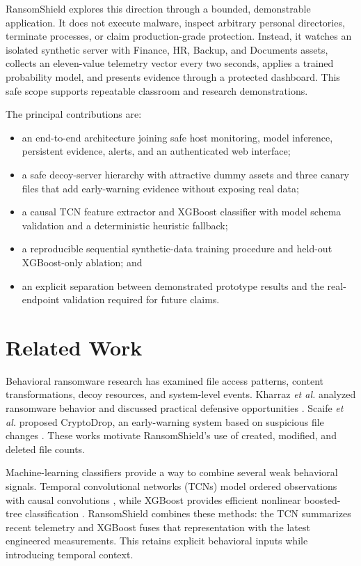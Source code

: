 \documentclass[conference]{IEEEtran}
\begin{document}
RansomShield explores this direction through a bounded, demonstrable application.
It does not execute malware, inspect arbitrary personal directories, terminate
processes, or claim production-grade protection. Instead, it watches an isolated
synthetic server with Finance, HR, Backup, and Documents assets, collects an
eleven-value telemetry vector every two seconds, applies a
trained probability model, and presents evidence through a protected dashboard.
This safe scope supports repeatable classroom and research demonstrations.

The principal contributions are:
\begin{itemize}
    \item an end-to-end architecture joining safe host monitoring, model
    inference, persistent evidence, alerts, and an authenticated web interface;
    \item a safe decoy-server hierarchy with attractive dummy assets and three
    canary files that add early-warning evidence without exposing real data;
    \item a causal TCN feature extractor and XGBoost classifier with model schema
    validation and a deterministic heuristic fallback;
    \item a reproducible sequential synthetic-data training procedure and
    held-out XGBoost-only ablation; and
    \item an explicit separation between demonstrated prototype results and the
    real-endpoint validation required for future claims.
\end{itemize}

\section{Related Work}
Behavioral ransomware research has examined file access patterns, content
transformations, decoy resources, and system-level events. Kharraz \emph{et al.}
analyzed ransomware behavior and discussed practical defensive opportunities
\cite{kharraz2015gordian}. Scaife \emph{et al.} proposed CryptoDrop, an early-warning
system based on suspicious file changes \cite{scaife2016cryptodrop}. These works
motivate RansomShield's use of created, modified, and deleted file counts.

Machine-learning classifiers provide a way to combine several weak behavioral
signals. Temporal convolutional networks (TCNs) model ordered observations with
causal convolutions \cite{bai2018tcn}, while XGBoost provides efficient nonlinear
boosted-tree classification \cite{chen2016xgboost}. RansomShield combines these
methods: the TCN summarizes recent telemetry and XGBoost fuses that representation
with the latest engineered measurements. This retains explicit behavioral inputs
while introducing temporal context.
\end{document}
